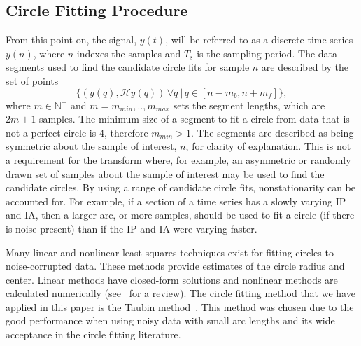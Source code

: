 \documentclass[journal,11pt,a4paper,onecolumn,draftcls]{IEEEtran}
\begin{document}

\subsection{Circle Fitting Procedure}\label{sect:CircleFittingProcedure}
From this point on, the signal, $y(t)$, will be referred to as a discrete time series $y(n)$, where $n$ indexes the samples and $T_s$ is the sampling period. The data segments used to find the candidate circle fits for sample $n$ are described by the set of points
\begin{equation}\label{eq:DataSegment}
\{\left(y\left(q\right),\mathcal{H}y\left(q\right)\right)  \,\forall q \ | \, q \in [n-m_b,n+m_f]\},
\end{equation}
where $m\in\mathbb{N}^+$ and $m=m_{min},..,m_{max}$ sets the segment lengths, which are $2m+1$ samples. The minimum size of a segment to fit a circle from data that is not a perfect circle is 4, therefore $m_{min}>1$. The segments are described as being symmetric about the sample of interest, $n$, for clarity of explanation. This is not a requirement for the transform where, for example, an asymmetric or randomly drawn set of samples about the sample of interest may be used to find the candidate circles. By using a range of candidate circle fits, nonstationarity can be accounted for. For example, if a section of a time series has a slowly varying IP and IA, then a larger arc, or more samples, should be used to fit a circle (if there is noise present) than if the IP and IA were varying faster.

Many linear and nonlinear least-squares techniques exist for fitting circles to noise-corrupted data. These methods provide estimates of the circle radius and center. Linear methods have closed-form solutions and nonlinear methods are calculated numerically (see~\cite{Chernov2005} for a review). The circle fitting method that we have applied in this paper is the Taubin method~\cite{Taubin1991}. This method was chosen due to the good performance when using noisy data with small arc lengths and its wide acceptance in the circle fitting literature.
\end{document}
